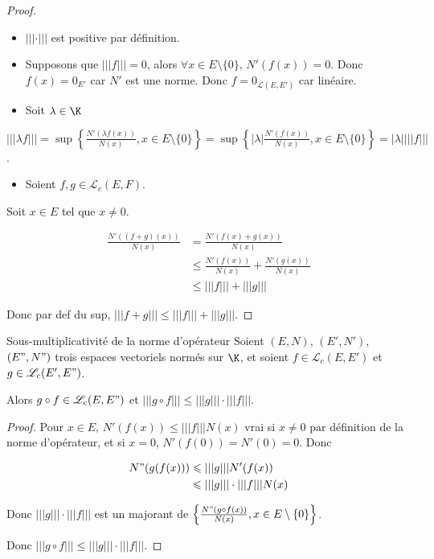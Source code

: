 \begin{proof}~
    \begin{itemize}
        \item $|||\cdot|||$ est positive par définition.
        \item Supposons que $|||f||| = 0$, alors $\forall x \in E \setminus \{0\}, \, N'(f(x)) = 0$.
            Donc $f(x) = 0_{E'}$ car $N'$ est une norme. Donc $f = 0_{\mathscr L(E, E')}$ car linéaire. 
        \item Soit $\lambda \in \K$
    \end{itemize}

    $|||\lambda f||| = \sup \left\{ \frac{N'(\lambda f(x))}{N(x)}, x \in E \setminus \{0\} \right\} = \sup \left\{ |\lambda| \frac{N'(f(x))}{N(x)}, x \in E \setminus \{0\} \right\} = |\lambda| |||f|||$.

    \begin{itemize}
        \item Soient $f, g \in \mathscr L_c(E, F)$.
    \end{itemize}

    Soit $x \in E$ tel que $x \neq 0$.

    \begin{align*}
         \frac{N'((f + g)(x))}{N(x)} & = \frac{N'(f(x) + g(x))}{N(x)} \\
            & \leqslant \frac{N'(f(x)) }{N(x)} + \frac{N'(g(x))}{N(x)} \\
            & \leqslant |||f||| + |||g|||
    \end{align*}

    Donc par def du sup, $|||f + g||| \leqslant |||f||| + |||g|||$.
\end{proof}


\begin{proposition}{Sous-multiplicativité de la norme d'opérateur}{}
    Soient $(E, N)$, $(E', N')$, $(E", N")$ trois espaces vectoriels normés sur $\K$, et soient $f \in \mathscr L_c(E, E')$ et $g \in \mathscr L_c(E', E")$.

    Alors $g \circ f \in \mathscr L_c(E, E")$ et $|||g \circ f||| \leqslant |||g||| \cdot |||f|||$.
\end{proposition}

\begin{proof}
    Pour $x \in E, \, N'(f(x)) \leqslant |||f||| N(x)$ vrai si $x \neq 0$ par définition 
    de la norme d'opérateur, et si $x = 0$, $N'(f(0)) = N'(0) = 0$.
    Donc  

    \begin{align*}
        N"(g(f(x))) & \leqslant |||g||| N'(f(x)) \\
        & \leqslant |||g||| \cdot |||f||| N(x)
    \end{align*}

    Donc $|||g||| \cdot |||f|||$ est un majorant de $\left\{ \frac{N"(g\circ f(x))}{N(x)}, x \in E \setminus \{0\} \right\}$.

    Donc $|||g \circ f||| \leqslant |||g||| \cdot |||f|||$.
\end{proof}

